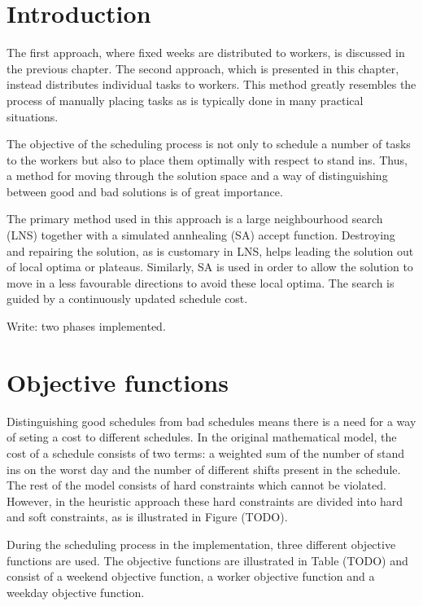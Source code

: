 
\section{Introduction}

The first approach, where fixed weeks are distributed to workers, is discussed in the previous chapter. The second approach, which is presented in this chapter, instead distributes individual tasks to workers. This method greatly resembles the process of manually placing tasks as is typically done in many practical situations. 

The objective of the scheduling process is not only to schedule a number of tasks to the workers but also to place them optimally with respect to stand ins. Thus, a method for moving through the solution space and a way of distinguishing between good and bad solutions is of great importance.  

The primary method used in this approach is a large neighbourhood search (LNS) together with a simulated annhealing (SA) accept function. Destroying and repairing the solution, as is customary in LNS, helps leading the solution out of local optima or plateaus. Similarly, SA is used in order to allow the solution to move in a less favourable directions to avoid these local optima. The 
search is guided by a continuously updated schedule cost.

Write: two phases implemented.

\section{Objective functions}
Distinguishing good schedules from bad schedules means there is a need for a way of seting a cost to different schedules. In the original mathematical model, the cost of a schedule consists of two terms: a weighted sum of the number of stand ins on the worst day and the number of different shifts present in the schedule. The rest of the model consists of hard constraints which cannot be violated. However, in the heuristic approach these hard constraints are divided into hard and soft constraints, as is illustrated in Figure (TODO).

During the scheduling process in the implementation, three different objective functions are used. The objective functions are illustrated in Table (TODO) and consist of a weekend objective function, a worker objective function and a weekday objective function.



